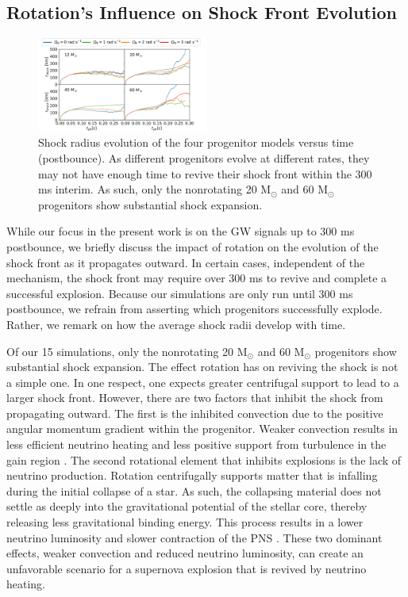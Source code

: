 \documentclass[twocolumn,times]{aastex62}  %
\newcommand{\Msun}{\ensuremath{\mathrm{M}_\odot}\xspace}
\begin{document}
\subsection{Rotation's Influence on Shock Front Evolution}

\begin{figure}[t]
    \centering
    \includegraphics[width = 0.5\textwidth]{M1_shock_mass_raster.pdf}
    \caption{Shock radius evolution of the four progenitor models versus time (postbounce).  As different progenitors evolve at different rates, they may not have enough time to revive their shock front within the 300 ms interim.  As such, only the nonrotating 20 \Msun and 60 \Msun progenitors show substantial shock expansion. }
    \label{fig:shock}
\end{figure} 

While our focus in the present work is on the GW signals up to 300 ms postbounce, we briefly discuss the impact of rotation on the evolution of the shock front as it propagates outward.  In certain cases, independent of the mechanism, the shock front may require over 300 ms to revive and complete a successful explosion.  Because our simulations are only run until 300 ms postbounce, we refrain from asserting which progenitors successfully explode.  Rather, we remark on how the average shock radii develop with time.

Of our 15 simulations, only the nonrotating 20 \Msun and 60 \Msun progenitors show substantial shock expansion.  The effect rotation has on reviving the shock is not a simple one. 
In one respect, one expects greater centrifugal support to lead to a larger shock front.  However, there are two factors that inhibit the shock from propagating outward.  The first is the inhibited convection due to the positive angular momentum gradient within the progenitor. Weaker convection results in less efficient neutrino heating \citep{dolence:2013, murphy:2013} and less positive support from turbulence in the gain region \citep{couch:2015a, mabanta:2018}.  The  second rotational element that inhibits explosions is the lack of neutrino production.  Rotation centrifugally supports matter that is infalling during the initial collapse of a star.  As such, the collapsing material does not settle as deeply into the gravitational potential of the stellar core, thereby releasing less gravitational binding energy.  This process results in a lower neutrino luminosity and slower contraction of the PNS \citep{summa:2018}. 
These two dominant effects, weaker convection and reduced neutrino luminosity, can create an unfavorable scenario for a supernova explosion that is revived by neutrino heating.
\end{document}
